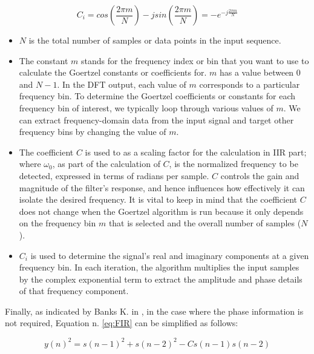 \begin{equation}
C_i=cos(\frac{2\pi m}{N})-jsin(\frac{2\pi m}{N})=-e^{-j\frac{2\pi m}{N}}
\end{equation}
\begin{itemize}
    \item 	$N$ is the total number of samples or data points in the input sequence.
    \item The constant $m$ stands for the frequency index or bin that you want to use to calculate the Goertzel constants or coefficients for. $m$ has a value between 0 and $N-1$. In the DFT output, each value of $m$ corresponds to a particular frequency bin. To determine the Goertzel coefficients or constants for each frequency bin of interest, we typically loop through various values of $m$. We can extract frequency-domain data from the input signal and target other frequency bins by changing the value of $m$.
    \item The coefficient $C$ is used to as a scaling factor for the calculation in IIR part; where $\omega_0$, as part of the calculation of $C$, is the normalized frequency to be detected, expressed in terms of radians per sample. $C$ controls the gain and magnitude of the filter's response, and hence influences how effectively it can isolate the desired frequency. It is vital to keep in mind that the coefficient $C$ does not change when the Goertzel algorithm is run because it only depends on the frequency bin $m$ that is selected and the overall number of samples ($N$).
    \item $C_i$ is used to determine the signal’s real and imaginary components at a given frequency bin. In each iteration, the algorithm multiplies the input samples by the complex exponential term to extract the amplitude and phase details of that frequency component.
\end{itemize}

Finally, as indicated by Banks K. in \cite{embedded}, in the case where the phase information is not required, Equation n. \ref{eq:FIR} can be simplified as follows:

\begin{equation}  \label{eq:yn2}
    y(n)^2 = s(n-1)^2 + s(n-2)^2 - C s(n-1) s(n-2)
\end{equation}